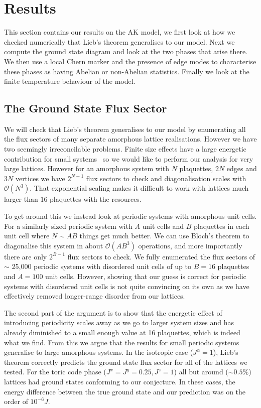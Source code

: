 \hypertarget{amk-results}{%
\section{Results}\label{amk-results}}

This section contains our results on the AK model, we first look at how we checked numerically that Lieb's theorem generalises to our model. Next we compute the ground state diagram and look at the two phases that arise there. We then use a local Chern marker and the presence of edge modes to characterise these phases as having Abelian or non-Abelian statistics. Finally we look at the finite temperature behaviour of the model.

\hypertarget{the-ground-state-flux-sector}{%
\subsection{The Ground State Flux Sector}\label{the-ground-state-flux-sector}}

We will check that Lieb's theorem generalises to our model by enumerating all the flux sectors of many separate amorphous lattice realisations. However we have two seemingly irreconcilable problems. Finite size effects have a large energetic contribution for small systems~\autocite{kitaevAnyonsExactlySolved2006} so we would like to perform our analysis for very large lattices. However for an amorphous system with \(N\) plaquettes, \(2N\) edges and \(3N\) vertices we have \(2^{N-1}\) flux sectors to check and diagonalisation scales with \(\mathcal{O}(N^3)\). That exponential scaling makes it difficult to work with lattices much larger than \(16\) plaquettes with the resources.

To get around this we instead look at periodic systems with amorphous unit cells. For a similarly sized periodic system with \(A\) unit cells and \(B\) plaquettes in each unit cell where \(N \sim AB\) things get much better. We can use Bloch's theorem to diagonalise this system in about \(\mathcal{O}(A B^3)\) operations, and more importantly there are only \(2^{B-1}\) flux sectors to check. We fully enumerated the flux sectors of \(\sim\) 25,000 periodic systems with disordered unit cells of up to \(B = 16\) plaquettes and \(A = 100\) unit cells. However, showing that our guess is correct for periodic systems with disordered unit cells is not quite convincing on its own as we have effectively removed longer-range disorder from our lattices.

The second part of the argument is to show that the energetic effect of introducing periodicity scales away as we go to larger system sizes and has already diminished to a small enough value at 16 plaquettes, which is indeed what we find. From this we argue that the results for small periodic systems generalise to large amorphous systems. In the isotropic case (\(J^\alpha = 1\)), Lieb's theorem correctly predicts the ground state flux sector for all of the lattices we tested. For the toric code phase (\(J^x = J^y = 0.25, J^z = 1\)) all but around (\(\sim 0.5 \%\)) lattices had ground states conforming to our conjecture. In these cases, the energy difference between the true ground state and our prediction was on the order of \(10^{-6} J\).

